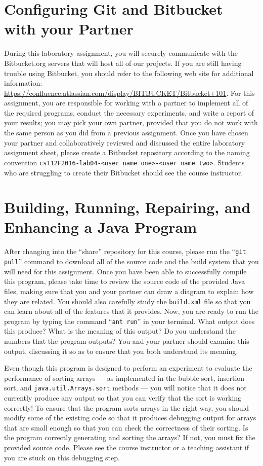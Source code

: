 \section*{Configuring Git and Bitbucket with your Partner}

During this laboratory assignment, you will securely communicate with the Bitbucket.org servers that will host all of
our projects.  If you are still having trouble using Bitbucket, you should refer to the following web site for
additional information: \url{https://confluence.atlassian.com/display/BITBUCKET/Bitbucket+101}.  For this assignment,
you are responsible for working with a partner to implement all of the required programs, conduct the necessary
experiments, and write a report of your results; you may pick your own partner, provided that you do not work with the
same person as you did from a previous assignment. Once you have chosen your partner and collaboratively reviewed and
discussed the entire laboratory assignment sheet, please create a Bitbucket repository according to the naming
convention {\tt cs112F2016-lab04-<user name one>-<user name two>}. Students who are struggling to create their Bitbucket
should see the course instructor.

\section*{Building, Running, Repairing, and Enhancing a Java Program}

After changing into the ``share'' repository for this course, please run the ``{\tt git pull}'' command to download all
of the source code and the build system that you will need for this assignment. Once you have been able to successfully
compile this program, please take time to review the source code of the provided Java files, making sure that you and
your partner can draw a diagram to explain how they are related. You should also carefully study the {\tt build.xml}
file so that you can learn about all of the features that it provides. Now, you are ready to run the program by typing
the command ``{\tt ant run}'' in your terminal. What output does this produce? What is the meaning of this output? Do
you understand the numbers that the program outputs? You and your partner should examine this output, discussing
it so as to ensure that you both understand its meaning.

Even though this program is designed to perform an experiment to evaluate the performance of sorting arrays --- as
implemented in the bubble sort, insertion sort, and {\tt java.util.Arrays.sort} methods --- you will notice that it does
not currently produce any output so that you can verify that the sort is working correctly! To ensure that the
program sorts arrays in the right way, you should modify some of the existing code so that it produces debugging
output for arrays that are small enough so that you can check the correctness of their sorting. Is the program
correctly generating and sorting the arrays? If not, you must fix the provided source code. Please see the course
instructor or a teaching assistant if you are stuck on this debugging step.

